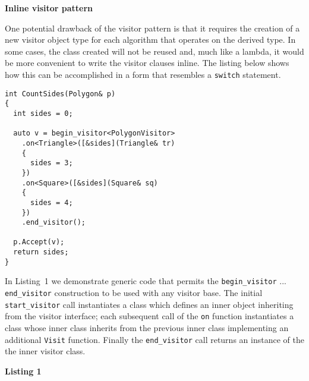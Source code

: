 \documentclass[10pt,a4paper]{article}
\renewcommand\section[1]{
    \begin{minipage}[c]{0.94\linewidth}
    \large \raggedright \sffamily \textbf{#1}
    \end{minipage}
}
\renewcommand\subsection[1]{
    \begin{minipage}[c]{0.94\linewidth}
    \raggedright \sffamily \textbf{#1}
    \end{minipage}
}
\newcommand\mycode[1]{{\small\texttt{#1}}}
\begin{document}
\section{Inline visitor pattern}

One potential drawback of the visitor pattern is that it requires the creation
of a new visitor object type for each algorithm that operates on the derived
type. In some cases, the class created will not be reused and, much like a
lambda, it would be more convenient to write the visitor clauses inline. The
listing below shows how this can be accomplished in a form that resembles a
\mycode{switch} statement.

{\small\begin{verbatim} 
int CountSides(Polygon& p) 
{ 
  int sides = 0;
  
  auto v = begin_visitor<PolygonVisitor> 
    .on<Triangle>([&sides](Triangle& tr) 
    {
      sides = 3; 
    }) 
    .on<Square>([&sides](Square& sq) 
    { 
      sides = 4; 
    }) 
    .end_visitor();
  
  p.Accept(v); 
  return sides; 
} \end{verbatim}}

In Listing~1 we demonstrate generic code that permits the
\mycode{begin\_visitor} ... \mycode{end\_visitor} construction to be used with
any visitor base. The initial \mycode{start\_visitor} call instantiates a class
which defines an inner object inheriting from the visitor interface; each
subsequent call of the \mycode{on} function instantiates a class whose inner
class inherits from the previous inner class implementing an additional
\mycode{Visit} function.  Finally the \mycode{end\_visitor} call returns an
instance of the the inner visitor class.

\subsection{Listing 1}
\end{document}
